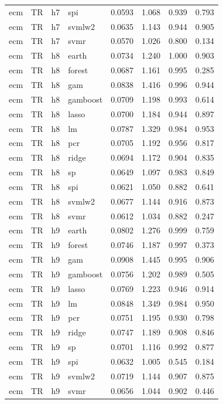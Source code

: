 \begin{ThreePartTable}
\begin{longtable}[t]{llclcccc}
ecm & TR & h7 & spi & 0.0593 & 1.068 & 0.939 & 0.793\\
ecm & TR & h7 & svmlw2 & 0.0635 & 1.143 & 0.944 & 0.905\\
ecm & TR & h7 & svmr & 0.0570 & 1.026 & 0.800 & 0.134\\
\addlinespace
ecm & TR & h8 & earth & 0.0734 & 1.240 & 1.000 & 0.903\\
ecm & TR & h8 & forest & 0.0687 & 1.161 & 0.995 & 0.285\\
ecm & TR & h8 & gam & 0.0838 & 1.416 & 0.996 & 0.944\\
ecm & TR & h8 & gamboost & 0.0709 & 1.198 & 0.993 & 0.614\\
ecm & TR & h8 & lasso & 0.0700 & 1.184 & 0.944 & 0.897\\
ecm & TR & h8 & lm & 0.0787 & 1.329 & 0.984 & 0.953\\
ecm & TR & h8 & pcr & 0.0705 & 1.192 & 0.956 & 0.817\\
ecm & TR & h8 & ridge & 0.0694 & 1.172 & 0.904 & 0.835\\
ecm & TR & h8 & sp & 0.0649 & 1.097 & 0.983 & 0.849\\
ecm & TR & h8 & spi & 0.0621 & 1.050 & 0.882 & 0.641\\
ecm & TR & h8 & svmlw2 & 0.0677 & 1.144 & 0.916 & 0.873\\
ecm & TR & h8 & svmr & 0.0612 & 1.034 & 0.882 & 0.247\\
\addlinespace
ecm & TR & h9 & earth & 0.0802 & 1.276 & 0.999 & 0.759\\
ecm & TR & h9 & forest & 0.0746 & 1.187 & 0.997 & 0.373\\
ecm & TR & h9 & gam & 0.0908 & 1.445 & 0.995 & 0.906\\
ecm & TR & h9 & gamboost & 0.0756 & 1.202 & 0.989 & 0.505\\
ecm & TR & h9 & lasso & 0.0769 & 1.223 & 0.946 & 0.914\\
ecm & TR & h9 & lm & 0.0848 & 1.349 & 0.984 & 0.950\\
ecm & TR & h9 & pcr & 0.0751 & 1.195 & 0.930 & 0.798\\
ecm & TR & h9 & ridge & 0.0747 & 1.189 & 0.908 & 0.846\\
ecm & TR & h9 & sp & 0.0701 & 1.116 & 0.992 & 0.877\\
ecm & TR & h9 & spi & 0.0632 & 1.005 & 0.545 & 0.184\\
ecm & TR & h9 & svmlw2 & 0.0719 & 1.144 & 0.907 & 0.875\\
ecm & TR & h9 & svmr & 0.0656 & 1.044 & 0.902 & 0.446\\

\end{longtable}
\end{ThreePartTable}
